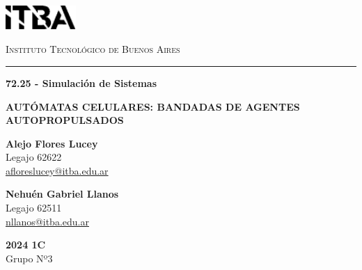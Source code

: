\documentclass[11pt, a4paper]{article}
\begin{document}
    \begin{titlepage}
        \begin{center}
            \begin{spacing}{1.5}
                \centering
                \includegraphics[width=0.2\textwidth]{./itba}
            \end{spacing}
            {\scshape\Large Instituto Tecnológico de Buenos Aires}
            {\rule{\textwidth}{0.4pt}}
            {\textbf{72.25 - Simulación de Sistemas}}
        \end{center}

        \vspace{35mm}

        \begin{center}
            \begin{spacing}{1.5}
                {\LARGE{\textbf{AUTÓMATAS CELULARES: BANDADAS DE AGENTES AUTOPROPULSADOS}}}
            \end{spacing}
        \end{center}

        \vspace{50mm}

        \begin{minipage}[t]{0.47\textwidth}
            \begin{center}
                {\textbf{Alejo Flores Lucey}}
                \\
                Legajo 62622
                \\
                {\href{mailto:afloreslucey@itba.edu.ar}{afloreslucey@itba.edu.ar}}
            \end{center}
        \end{minipage}
        \hfill
        \begin{minipage}[t]{0.47\textwidth}
            \begin{center}
                {\textbf{Nehuén Gabriel Llanos}}
                \\
                Legajo 62511
                \\
                {\href{mailto:nllanos@itba.edu.ar}{nllanos@itba.edu.ar}}
            \end{center}
        \end{minipage}

        \vspace{25mm}

        \begin{center}
            {\large{\textbf{2024 1C}}}
            \\
            {\large{Grupo Nº3}}
        \end{center}
    \end{titlepage}
\end{document}
